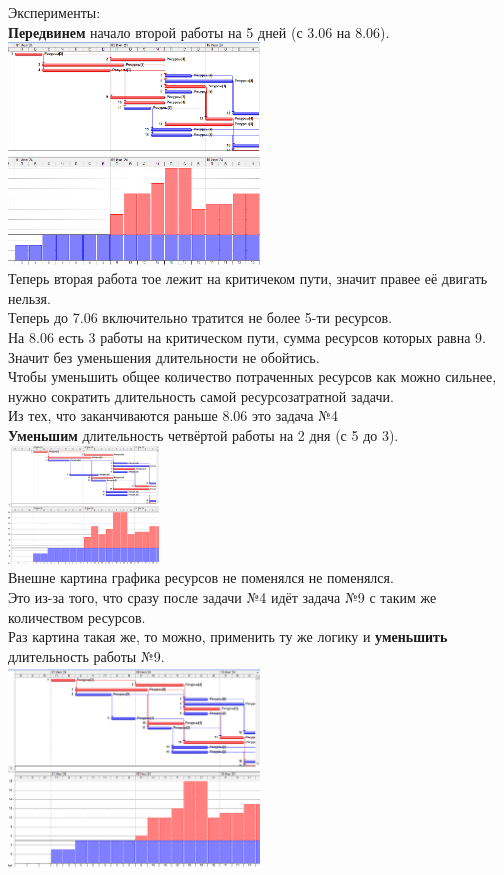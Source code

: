 \documentclass[14pt]{article}
\begin{document}
	Эксперименты:\\
	\textbf{Передвинем }начало второй работы на 5 дней (с 3.06 на 8.06).\\
	\includegraphics[width=0.5\textwidth]{../img/ot1a1_1.png}\\
	Теперь вторая работа тое лежит на критичеком пути, значит правее её двигать нельзя.\\
	Теперь до 7.06 включительно тратится не более 5-ти ресурсов.\\
	На 8.06 есть 3 работы на критическом пути, сумма ресурсов которых равна 9.\\
	Значит без уменьшения длительности не обойтись.\\
	Чтобы уменьшить общее количество потраченных ресурсов как можно сильнее,
		нужно сократить длительность самой ресурсозатратной задачи.\\
	Из тех, что заканчиваются раньше 8.06 это задача №4\\
	\textbf{Уменьшим} длительность четвёртой работы на 2 дня (с 5 до 3).\\
	\includegraphics[width=0.3\textwidth]{../img/ot1a1_2.png}\\
	Внешне картина графика ресурсов не поменялся не поменялся.\\
	Это из-за того, что сразу после задачи №4 идёт задача №9 с таким же количеством ресурсов.\\
	Раз картина такая же, то можно, применить ту же логику и \textbf{уменьшить} длительность работы №9.\\
	\includegraphics[width=0.5\textwidth]{../img/ot1a1_3.png}\\
\end{document}
